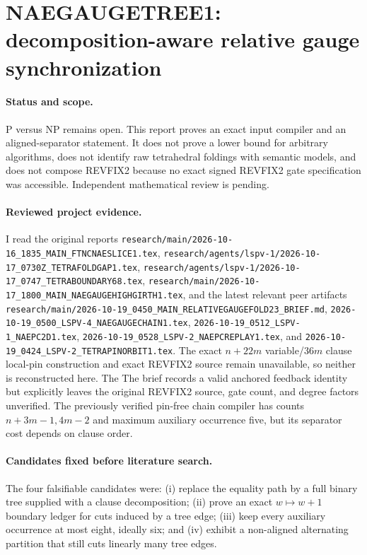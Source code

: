 \section*{NAEGAUGETREE1: decomposition-aware relative gauge synchronization}

\paragraph{Status and scope.}
P versus NP remains open.  This report proves an exact input compiler and an
aligned-separator statement.  It does not prove a lower bound for arbitrary
algorithms, does not identify raw tetrahedral foldings with semantic models,
and does not compose REVFIX2 because no exact signed REVFIX2 gate specification
was accessible.  Independent mathematical review is pending.

\paragraph{Reviewed project evidence.}
I read the original reports
\texttt{research/main/2026-10-16\_1835\_MAIN\_FTNCNAESLICE1.tex},
\texttt{research/agents/lspv-1/2026-10-17\_0730Z\_TETRAFOLDGAP1.tex},
\texttt{research/agents/lspv-1/2026-10-17\_0747\_TETRABOUNDARY68.tex},
\texttt{research/main/2026-10-17\_1800\_MAIN\_NAEGAUGEHIGHGIRTH1.tex},
and the latest relevant peer artifacts
\texttt{research/main/2026-10-19\_0450\_MAIN\_RELATIVEGAUGEFOLD23\_BRIEF.md},
\texttt{2026-10-19\_0500\_LSPV-4\_NAEGAUGECHAIN1.tex},
\texttt{2026-10-19\_0512\_LSPV-1\_NAEPC2D1.tex},
\texttt{2026-10-19\_0528\_LSPV-2\_NAEPCREPLAY1.tex}, and
\texttt{2026-10-19\_0424\_LSPV-2\_TETRAPINORBIT1.tex}.
The exact $n+22m$ variable/$36m$ clause local-pin construction and exact
REVFIX2 source remain unavailable, so neither is reconstructed here.  The
The brief records a valid anchored feedback identity but explicitly leaves the
original REVFIX2 source, gate count, and degree factors unverified.  The
previously verified pin-free chain compiler has counts $n+3m-1,4m-2$ and
maximum auxiliary occurrence five, but its separator cost depends on clause
order.

\paragraph{Candidates fixed before literature search.}
The four falsifiable candidates were: (i) replace the equality path by a full
binary tree supplied with a clause decomposition; (ii) prove an exact
$w\mapsto w+1$ boundary ledger for cuts induced by a tree edge; (iii) keep
every auxiliary occurrence at most eight, ideally six; and (iv) exhibit a
non-aligned alternating partition that still cuts linearly many tree edges.

